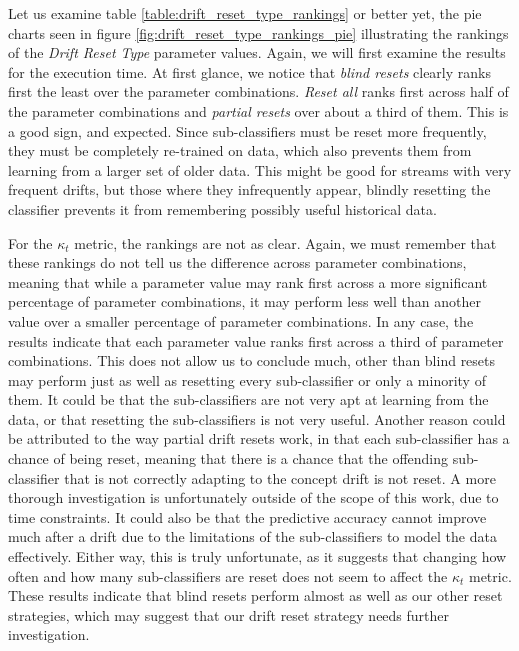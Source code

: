Let us examine table \ref{table:drift_reset_type_rankings} or better yet, the pie charts seen in figure \ref{fig:drift_reset_type_rankings_pie} illustrating the rankings of the \textit{Drift Reset Type} parameter values.
Again, we will first examine the results for the execution time. At first glance, we notice that \textit{blind resets} clearly ranks first the least over the parameter combinations. \textit{Reset all} ranks first across half of the parameter combinations and \textit{partial resets} over about a third of them. This is a good sign, and expected. Since sub-classifiers must be reset more frequently, they must be completely re-trained on data, which also prevents them from learning from a larger set of older data. This might be good for streams with very frequent drifts, but those where they infrequently appear, blindly resetting the classifier prevents it from remembering possibly useful historical data.

For the $\kappa_t$ metric, the rankings are not as clear. Again, we must remember that these rankings do not tell us the difference across parameter combinations, meaning that while a parameter value may rank first across a more significant percentage of parameter combinations, it may perform less well than another value over a smaller percentage of parameter combinations.
In any case, the results indicate that each parameter value ranks first across a third of parameter combinations. This does not allow us to conclude much, other than blind resets may perform just as well as resetting every sub-classifier or only a minority of them. It could be that the sub-classifiers are not very apt at learning from the data, or that resetting the sub-classifiers is not very useful. Another reason could be attributed to the way partial drift resets work, in that each sub-classifier has a chance of being reset, meaning that there is a chance that the offending sub-classifier that is not correctly adapting to the concept drift is not reset. A more thorough investigation is unfortunately outside of the scope of this work, due to time constraints. It could also be that the predictive accuracy cannot improve much after a drift due to the limitations of the sub-classifiers to model the data effectively. Either way, this is truly unfortunate, as it suggests that changing how often and how many sub-classifiers are reset does not seem to affect the $\kappa_t$ metric.
These results indicate that blind resets perform almost as well as our other reset strategies, which may suggest that our drift reset strategy needs further investigation.

